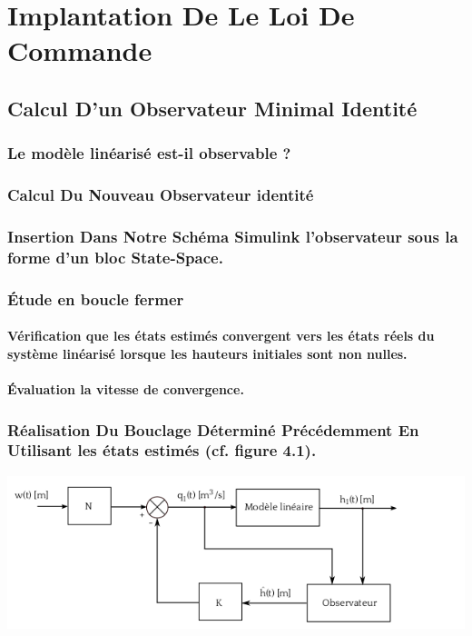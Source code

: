 \chapter{Implantation De Le Loi De Commande}
 \section{Calcul D’un Observateur Minimal Identité}

 \subsection{Le modèle linéarisé est-il observable ?}
 
 
 \subsection{Calcul Du Nouveau Observateur identité }
 
 \subsection{Insertion Dans Notre  Schéma Simulink l’observateur sous la forme d’un bloc State-Space.}
 
 
 \subsection{Étude en boucle fermer  }
  \subsubsection{ Vérification que les états estimés convergent vers les états réels du système linéarisé
lorsque les hauteurs initiales sont non nulles.}
  \subsubsection{Évaluation la vitesse de convergence.}
  
  
 \subsection{Réalisation Du Bouclage Déterminé Précédemment En Utilisant les états estimés (cf. figure 4.1).} 
 
\begin{center}
\includegraphics[scale=0.5]{fig3.png}
\label{fig3} 
\end{center}
 
